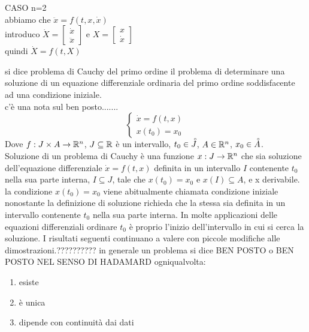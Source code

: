 \begin{example}
	CASO n=2\\
	abbiamo che $\ddot{x}=f(t,x,\dot{x})$\\
	introduco $\dot{X}=\begin{bmatrix}\dot{x}\\\ddot{x}\end{bmatrix}$ e $X=\begin{bmatrix}x\\\dot{x}\end{bmatrix}$\\
	quindi $\dot{X}=f(t,X)$
\end{example}
si dice problema di Cauchy del primo ordine il problema di determinare una soluzione di un equazione differenziale ordinaria del primo ordine soddisfacente ad una condizione iniziale.\\
c'è una nota sul ben posto.......\\
$$\left\{\begin{matrix}
\dot{x}=f(t,x)\\x(t_0)=x_0
\end{matrix}\right.$$
Dove $f:J\times A\to \mathbb{R}^n$, $J\subseteq \mathbb{R}$ è un intervallo, $t_0\in\accentset{\circ}{J}$, $A\in \mathbb{R}^n$, $x_0\in\accentset{\circ}{A}$.\\
Soluzione di un problema di Cauchy è una funzione $x:J\to \mathbb{R}^n$ che sia soluzione dell'equazione differenziale $\dot{x}=f(t,x)$ definita in un intervallo $I$ contenente $t_0$ nella sua parte interna, $I\subseteq J$, tale che $x(t_0)=x_0$ e $x(I)\subseteq A$, e x derivabile.
\observation
la condizione $x(t_0)=x_0$ viene abitualmente chiamata condizione iniziale nonostante la definizione di soluzione richieda che la stessa sia definita in un intervallo contenente $t_0$ nella sua parte interna. In molte applicazioni delle equazioni differenziali ordinare $t_0$ è proprio l'inizio dell'intervallo in cui si cerca la soluzione. I risultati seguenti continuano a valere con piccole modifiche alle dimostrazioni.??????????
\observation
in generale un problema si dice BEN POSTO o BEN POSTO NEL SENSO DI HADAMARD ogniqualvolta:
\begin{enumerate}
	\item esiste
	\item è unica
	\item dipende con continuità dai dati
\end{enumerate} 
